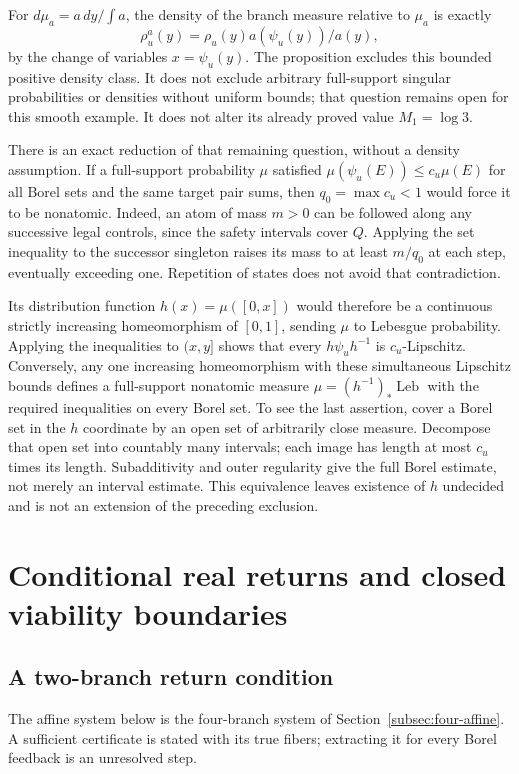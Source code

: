 \documentclass[11pt,reqno]{amsart}
\numberwithin{equation}{section}
\theoremstyle{definition}
\newcommand{\Leb}{\operatorname{Leb}}
\begin{document}
For $d\mu_a=a\,dy/\int a$, the density of the branch measure
relative to $\mu_a$ is exactly
\[
 \rho_u^a(y)=\rho_u(y)a(\psi_u(y))/a(y),
\]
by the change of variables
$x=\psi_u(y)$. The proposition excludes this bounded positive
density class. It does not exclude arbitrary full-support singular
probabilities or densities without uniform bounds; that question
remains open for this smooth example. It does not alter its already
proved value $M_1=\log3$.

There is an exact reduction of that remaining question, without a
density assumption. If a full-support probability $\mu$ satisfied
$\mu(\psi_u(E))\le c_u\mu(E)$ for all Borel sets and the
same target pair sums, then $q_0=\max c_u<1$ would force it to
be nonatomic. Indeed, an atom of mass $m>0$ can be followed along
any successive legal controls, since the safety intervals cover
$Q$. Applying the set inequality to the successor singleton raises
its mass to at least $m/q_0$ at each step, eventually exceeding
one. Repetition of states does not avoid that contradiction.

Its distribution function $h(x)=\mu([0,x])$ would therefore be a
continuous strictly increasing homeomorphism of $[0,1]$, sending
$\mu$ to Lebesgue probability. Applying the inequalities to
$(x,y]$ shows that every $h\psi_uh^{-1}$ is $c_u$-Lipschitz.
Conversely, any one increasing homeomorphism with these simultaneous
Lipschitz bounds defines a full-support nonatomic measure
$\mu=(h^{-1})_*\Leb$ with the required inequalities on every
Borel set. To see the last assertion, cover a Borel set in the
$h$ coordinate by an open set of arbitrarily close measure.
Decompose that open set into countably many intervals; each image
has length at most $c_u$ times its length. Subadditivity and
outer regularity give the full Borel estimate, not merely an
interval estimate. This equivalence leaves existence of $h$
undecided and is not an extension of the preceding exclusion.

\section{Conditional real returns and closed viability boundaries}
\label{app:returns}

\subsection{A two-branch return condition}
The affine system below is the four-branch system of
Section~\ref{subsec:four-affine}. A sufficient certificate is stated
with its true fibers; extracting it for every Borel feedback is an
unresolved step.
\end{document}
